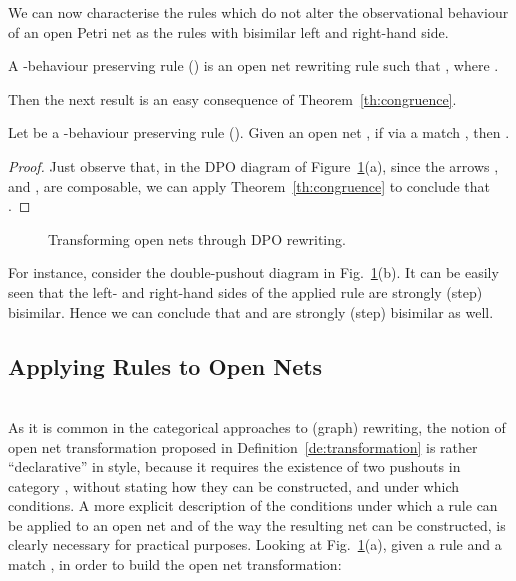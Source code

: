 \documentclass{LMCS}
\begin{document}
We can now characterise the rules which do not alter the
observational behaviour of an open Petri net as the rules with
bisimilar left and right-hand side.

\begin{defi}
  \label{de:beh-pres-rule}
  A -behaviour preserving rule () is an open net rewriting rule  such
  that , where .
\end{defi}


Then the next result is an easy consequence of
Theorem~\ref{th:congruence}.

\begin{thm}
  \label{th:behaviour-preserving-reconfigurations}
  Let  be a -behaviour preserving rule ().
Given an open net , if  via a 
match , then . 
  \end{thm}

\begin{proof}Just observe that, in the DPO diagram 
  of Figure~\ref{fi:open-dpo}(a),
since the arrows ,  and ,  are composable, we can apply
  Theorem~\ref{th:congruence} to conclude that .
\end{proof}


\begin{figure}[t]
  
\caption{Transforming open nets through DPO rewriting.}
\label{fi:open-dpo}
\end{figure}


For instance, consider the double-pushout diagram in
Fig.~\ref{fi:open-dpo}(b).  It can be easily seen that the left- and
right-hand sides of the applied rule are strongly (step) bisimilar.
Hence we can conclude that  and  are strongly (step) bisimilar
as well.


\subsection{Applying Rules to Open Nets}
\ \\

\noindent
As it is common in the categorical approaches to (graph) rewriting,
the notion of open net transformation proposed in
Definition~\ref{de:transformation} is rather ``declarative'' in style,
because it requires the existence of two pushouts in category ,
without stating how they can be constructed, and under which
conditions.  A more explicit description of the conditions under which
a rule can be applied to an open net and of the way the resulting net
can be constructed, is clearly necessary for practical purposes.
Looking at Fig.~\ref{fi:open-dpo}(a), 
given a rule  and a match , in order to
build the open net transformation:
\end{document}
